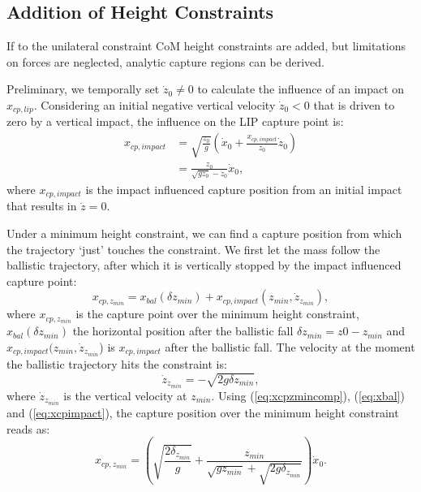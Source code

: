 \documentclass[letterpaper, 10 pt, conference]{ieeeconf}  %
\newcommand{\zmin}{z_{min}}
\begin{document}
\subsection{Addition of Height Constraints}
If to the unilateral constraint CoM height constraints are added, but limitations on forces are neglected, analytic capture regions can be derived. 

Preliminary, we temporally set $\dot{z}_0 \neq 0$ to calculate the influence of an impact on $x_{cp,lip}$. Considering an initial negative vertical velocity $\dot{z}_0<0$ that is driven to zero by a vertical impact, the influence on the LIP capture point is:
\begin{align}
	x_{cp,impact} &= \sqrt{\frac{z_0}{g}}(\dot{x}_0 + \frac{x_{cp,impact}}{z_0}\dot{z}_0)\\
	&=\frac{z_0}{\sqrt{gz_0}-\dot{z}_0}\dot{x}_0, \label{eq:xcpimpact}
\end{align}
where $x_{cp,impact}$ is the impact influenced capture position from an initial impact that results in $\dot{z}=0$.

Under a minimum height constraint, we can find a capture position from which the trajectory `just' touches the constraint. We first let the mass follow the ballistic trajectory, after which it is vertically stopped by the impact influenced capture point:
\begin{equation}
	x_{cp,\zmin} = x_{bal}(\delta \zmin) + x_{cp,impact}(\zmin, \dot{z}_{\zmin}),
	\label{eq:xcpzmincomp}
\end{equation}
where $x_{cp,\zmin}$ is the capture point over the minimum height constraint, $x_{bal}(\delta \zmin)$ the horizontal position after the ballistic fall $\delta \zmin = z0-\zmin$ and $x_{cp,impact}(\zmin,\dot{z}_{\zmin}$) is $x_{cp,impact}$ after the ballistic fall. The velocity at the moment the ballistic trajectory hits the constraint is:
\begin{equation}
	\dot{z}_{\zmin} = -\sqrt{2g\delta \zmin},
\end{equation}
where $\dot{z}_{\zmin}$ is the vertical velocity at $z_{min}$. Using (\ref{eq:xcpzmincomp}), (\ref{eq:xbal}) and (\ref{eq:xcpimpact}), the capture position over the minimum height constraint reads as:
\begin{equation}
	x_{cp,\zmin} = (\sqrt{\frac{2\delta_{z_{min}}}{g}} + \frac{\zmin}{\sqrt{g \zmin}+\sqrt{2g\delta_{\zmin}}})\dot{x}_0.
\end{equation}
\end{document}
